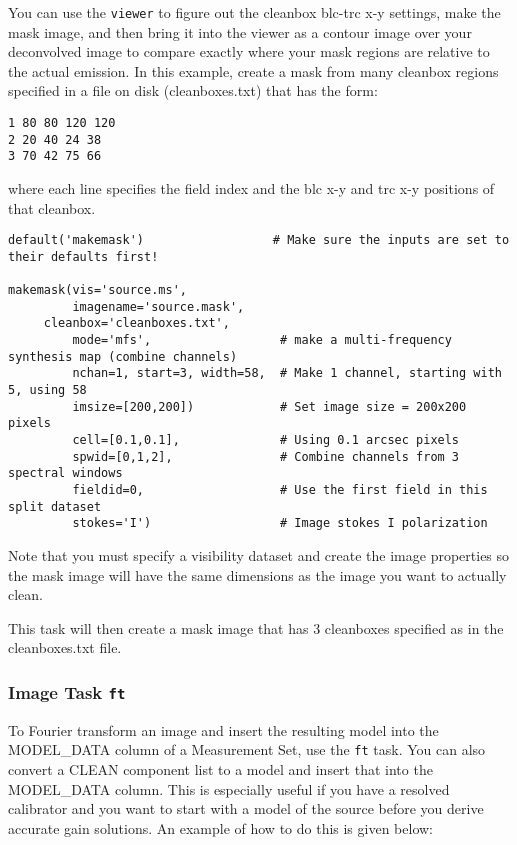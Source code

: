 You can use the {\tt viewer} to figure out the cleanbox blc-trc x-y
settings, make the mask image, and then bring it into the viewer as a
contour image over your deconvolved image to compare exactly where
your mask regions are relative to the actual emission.  In this
example, create a mask from many cleanbox regions specified in a file
on disk (cleanboxes.txt) that has the form: 

\small
\begin{verbatim}
1 80 80 120 120
2 20 40 24 38
3 70 42 75 66
\end{verbatim}
\normalsize
where each line specifies the field index and the blc x-y and trc x-y
positions of that cleanbox.  

\small
\begin{verbatim}
default('makemask')                  # Make sure the inputs are set to their defaults first!

makemask(vis='source.ms',
         imagename='source.mask',
	 cleanbox='cleanboxes.txt',
         mode='mfs',                  # make a multi-frequency synthesis map (combine channels)
         nchan=1, start=3, width=58,  # Make 1 channel, starting with 5, using 58
         imsize=[200,200])            # Set image size = 200x200 pixels
         cell=[0.1,0.1],              # Using 0.1 arcsec pixels
         spwid=[0,1,2],               # Combine channels from 3 spectral windows
         fieldid=0,                   # Use the first field in this split dataset
         stokes='I')                  # Image stokes I polarization
\end{verbatim}
\normalsize

Note that you must specify a visibility dataset and create the image
properties so the mask image will have the same dimensions as the
image you want to actually clean.  

This task will then create a mask image that has 3 cleanboxes
specified as in the cleanboxes.txt file.  

\subsubsection{Image Task {\tt ft}}

To Fourier transform an image and insert the resulting model into the
MODEL\_DATA column of a Measurement Set, use the {\tt ft} task.  
You can also convert a CLEAN component list to a model and insert that
into the MODEL\_DATA column.   This is especially useful if you have a
resolved calibrator and you want to start with a model of the source
before you derive accurate gain solutions.  
An example of how to do this is given below: 

